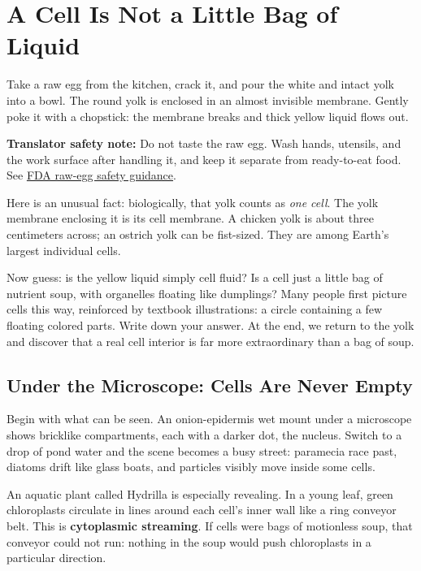 \chapter{A Cell Is Not a Little Bag of Liquid}

\begin{kaichang}
Take a raw egg from the kitchen, crack it, and pour the white and intact yolk into a bowl. The round yolk is enclosed in an almost invisible membrane. Gently poke it with a chopstick: the membrane breaks and thick yellow liquid flows out.

\textbf{Translator safety note:} Do not taste the raw egg. Wash hands, utensils, and the work surface after handling it, and keep it separate from ready-to-eat food. See \href{https://www.fda.gov/food/retail-food-industryregulatory-assistance-training/assuring-safety-eggs-and-menu-and-deli-items-made-raw-shell-eggs}{FDA raw-egg safety guidance}.

Here is an unusual fact: biologically, that yolk counts as \emph{one cell}. The yolk membrane enclosing it is its cell membrane. A chicken yolk is about three centimeters across; an ostrich yolk can be fist-sized. They are among Earth's largest individual cells.

Now guess: is the yellow liquid simply cell fluid? Is a cell just a little bag of nutrient soup, with organelles floating like dumplings? Many people first picture cells this way, reinforced by textbook illustrations: a circle containing a few floating colored parts. Write down your answer. At the end, we return to the yolk and discover that a real cell interior is far more extraordinary than a bag of soup.
\end{kaichang}

\section{Under the Microscope: Cells Are Never Empty}

Begin with what can be seen. An onion-epidermis wet mount under a microscope shows bricklike compartments, each with a darker dot, the nucleus. Switch to a drop of pond water and the scene becomes a busy street: paramecia race past, diatoms drift like glass boats, and particles visibly move inside some cells.

An aquatic plant called Hydrilla is especially revealing. In a young leaf, green chloroplasts circulate in lines around each cell's inner wall like a ring conveyor belt. This is \textbf{cytoplasmic streaming}. If cells were bags of motionless soup, that conveyor could not run: nothing in the soup would push chloroplasts in a particular direction.

